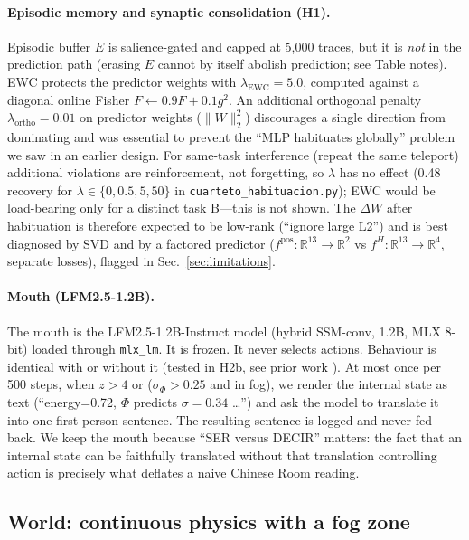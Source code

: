 \documentclass[11pt,a4paper]{article}
\begin{document}
\paragraph{Episodic memory and synaptic consolidation (H1).} Episodic buffer $E$ is salience-gated and capped at 5,000 traces, but it is \textit{not} in the prediction path (erasing $E$ cannot by itself abolish prediction; see Table notes). EWC \cite{kirkpatrick2017} protects the predictor weights with $\lambda_{\mathrm{EWC}}=5.0$, computed against a diagonal online Fisher $F \leftarrow 0.9F + 0.1 g^2$. An additional orthogonal penalty $\lambda_{\mathrm{ortho}}=0.01$ on predictor weights ($\|W\|_2^2$) discourages a single direction from dominating and was essential to prevent the ``MLP habituates globally'' problem we saw in an earlier design. For same-task interference (repeat the same teleport) additional violations are reinforcement, not forgetting, so $\lambda$ has no effect (0.48 recovery for $\lambda\in\{0,0.5,5,50\}$ in \texttt{cuarteto\_habituacion.py}); EWC would be load-bearing only for a distinct task B---this is not shown. The $\Delta W$ after habituation is therefore expected to be low-rank (``ignore large L2'') and is best diagnosed by SVD and by a factored predictor ($f^{\mathrm{pos}}:\mathbb{R}^{13}\rightarrow\mathbb{R}^2$ vs $f^{H}:\mathbb{R}^{13}\rightarrow\mathbb{R}^4$, separate losses), flagged in Sec.~\ref{sec:limitations}.

\paragraph{Mouth (LFM2.5-1.2B).} The mouth is the LFM2.5-1.2B-Instruct model (hybrid SSM-conv, 1.2B, MLX 8-bit) loaded through \texttt{mlx\_lm}. It is frozen. It never selects actions. Behaviour is identical with or without it (tested in H2b, see prior work \cite{lfm2025}). At most once per 500 steps, when $z>4$ or ($\sigma_\Phi>0.25$ and in fog), we render the internal state as text (``energy=0.72, $\Phi$ predicts $\sigma=0.34$ \dots'') and ask the model to translate it into one first-person sentence. The resulting sentence is logged and never fed back. We keep the mouth because ``SER versus DECIR'' matters: the fact that an internal state can be faithfully translated without that translation controlling action is precisely what deflates a naive Chinese Room reading.

\subsection{World: continuous physics with a fog zone}
\end{document}
